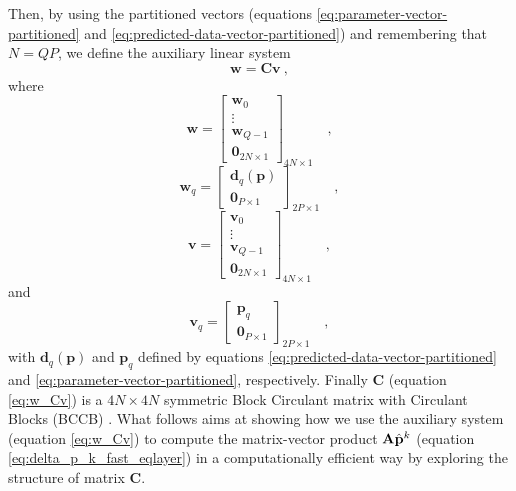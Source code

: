 \documentclass[manuscript,revised]{geophysics}
\begin{document}
Then, by using the partitioned vectors 
(equations \ref{eq:parameter-vector-partitioned} and \ref{eq:predicted-data-vector-partitioned}) 
and remembering that $N = QP$, we define the auxiliary linear system
\begin{equation}
\mathbf{w} = \mathbf{C} \mathbf{v} \: ,
\label{eq:w_Cv}
\end{equation}
where
\begin{equation}
\mathbf{w} = \begin{bmatrix}
\mathbf{w}_{0} \\
\vdots \\
\mathbf{w}_{Q - 1} \\
\mathbf{0}_{2N \times 1}
\end{bmatrix}_{4N \times 1} \quad ,
\label{eq:w-vector}
\end{equation}
\begin{equation}
\mathbf{w}_{q} = \begin{bmatrix}
\mathbf{d}_{q}(\mathbf{p}) \\
\mathbf{0}_{P \times 1}
\end{bmatrix}_{2P \times 1}
\label{eq:wq-vector} \quad ,
\end{equation}
\begin{equation}
\mathbf{v} = \begin{bmatrix}
\mathbf{v}_{0} \\
\vdots \\
\mathbf{v}_{Q - 1} \\
\mathbf{0}_{2N \times 1}
\end{bmatrix}_{4N \times 1} \quad ,
\label{eq:v-vector}
\end{equation}
and
\begin{equation}
\mathbf{v}_{q} = \begin{bmatrix}
\mathbf{p}_{q} \\
\mathbf{0}_{P \times 1}
\end{bmatrix}_{2P \times 1}
\label{eq:vq-vector} \quad ,
\end{equation}
with $\mathbf{d}_{q}(\mathbf{p})$ and $\mathbf{p}_{q}$ defined by
equations \ref{eq:predicted-data-vector-partitioned} and 
\ref{eq:parameter-vector-partitioned}, respectively.
Finally $\mathbf{C}$ (equation \ref{eq:w_Cv}) is a 
$4N \times 4N$ symmetric Block Circulant matrix with Circulant Blocks (BCCB) 
\citep[][ p. 184]{davis1979}.
What follows aims at showing how we use the auxiliary system 
(equation \ref{eq:w_Cv}) to compute the 
matrix-vector product $\tensor{A} \hat{\mathbf{p}}^{k}$ 
(equation \ref{eq:delta_p_k_fast_eqlayer}) in a computationally 
efficient way by exploring the structure of matrix $\mathbf{C}$.
\end{document}
